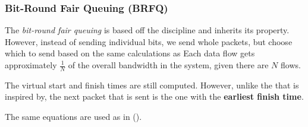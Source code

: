 \subsubsection{Bit-Round Fair Queuing (BRFQ)}\label{subsubsec:Bit_Round_Fair_Queuing}
\begin{definition}\label{def:Bit_Round_Fair_Queuing}
  The \emph{bit-round fair queuing}  is based off the  discipline and inherits its  property.
  However, instead of sending individual bits, we send whole packets, but choose which to send based on the same calculations as 
  Each data flow gets approximately $\frac{1}{N}$ of the overall bandwidth in the system, given there are $N$ flows.

  The virtual start and finish times are still computed.
  However, unlike the  that  is inspired by, the next packet that is sent is the one with the \textbf{earliest finish time}.

  The same equations are used as in  ().
\end{definition}

